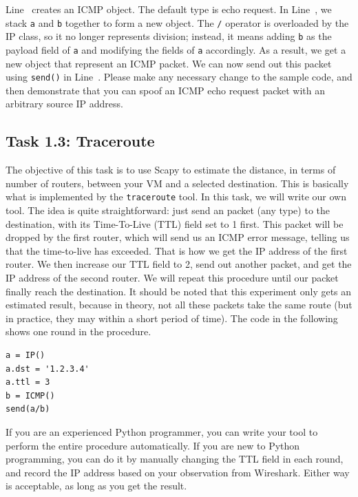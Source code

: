 Line~ creates an ICMP object. The default type is echo request.
In Line~, we stack \texttt{a} and \texttt{b} together to 
form a new object. The \texttt{/} operator is overloaded by the
IP class, so it no longer represents division; instead, it means 
adding \texttt{b} as the payload field of \texttt{a} and modifying
the fields of \texttt{a} accordingly. As a result, we get a new 
object that represent an ICMP packet. We can now send out this packet 
using \texttt{send()} in Line~. Please make any necessary change
to the sample code, and then demonstrate that you can spoof an ICMP echo
request packet with an arbitrary source IP address. 



\subsection{Task 1.3: Traceroute} 

The objective of this task is to use Scapy to estimate the distance, in
terms of number of routers, between your VM and a selected destination.  
This is basically what is implemented by the \texttt{traceroute} tool. 
In this task, we will write our own tool. The idea is quite
straightforward: just send an packet (any type) to the destination, with
its Time-To-Live (TTL) field set to 1 first. This packet will be dropped by
the first router, which will send us an ICMP error message, telling us 
that the time-to-live has exceeded. That is how we get the IP address of
the first router. We then increase our TTL field to 2, send out another
packet, and get the IP address of the second router. We will repeat this
procedure until our packet finally reach the destination. It should be
noted that this experiment only gets an estimated result, because in
theory, not all these packets take the same route (but in practice, they may
within a short period of time). The code in the following shows one round 
in the procedure. 


\begin{lstlisting}
a = IP()
a.dst = '1.2.3.4'
a.ttl = 3
b = ICMP()
send(a/b)
\end{lstlisting}


If you are an experienced Python programmer, you can write your tool 
to perform the entire procedure automatically. If you are new to Python
programming, you can do it by manually changing the TTL field in 
each round, and record the IP address based on your observation 
from Wireshark. Either way is acceptable, as long as you get the result. 


